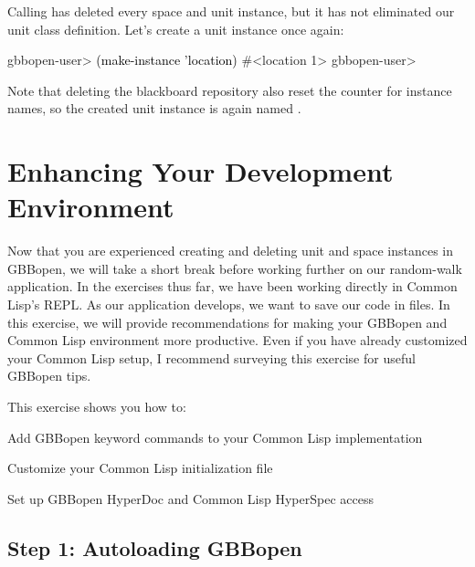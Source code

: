 \documentclass[10pt,twoside,english,pdftex]{article}
\begin{document}
%
Calling  has deleted every space
and unit instance, but it has not eliminated our  unit
class definition.  Let's create a  unit instance once
again:
%
\W\supp
\begin{example}
\textcolor{darkergray}{%
  gbbopen-user> \textcolor{black}{(make-instance 'location)}
  #<location 1>
  gbbopen-user>}
\end{example}
%
Note that deleting the blackboard repository also reset the counter for
 instance names, so the created unit instance is again
named .


\T\markright{}%
\T\pagestyle{plain}
\T\cleardoublepage
\W{}
\T\pagestyle{fancy}
\T\thispagestyle{fancybottom}
\T\renewcommand{\headrulewidth}{0pt}
\section{Enhancing Your Development Environment}
\label{sec:environment}%

Now that you are experienced creating and deleting unit and space instances in
GBBopen, we will take a short break before working further on our random-walk
application.  In the exercises thus far, we have been working directly in
Common Lisp's REPL.  As our application develops, we want to save our code in
files. In this exercise, we will provide recommendations for making your
GBBopen and Common Lisp environment more productive.  Even if you have already
customized your Common Lisp setup, I recommend surveying this exercise for
useful GBBopen tips.

\fndocrule

This exercise shows you how to:
\begin{tightitemize}
\item Add GBBopen keyword commands to your Common Lisp implementation
\item Customize your Common Lisp initialization file
\item Set up GBBopen HyperDoc and Common Lisp HyperSpec access
\end{tightitemize}

\fndocrule

\subsection*{Step 1: Autoloading GBBopen}
\end{document}
